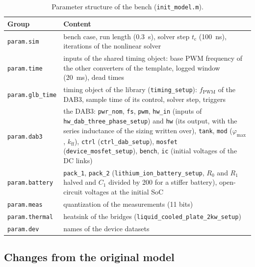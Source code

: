 \documentclass[12pt,a4paper]{scrartcl}
\newcommand{\ped}[1]{_{\mathrm{#1}}}
\newcommand{\code}[1]{\texttt{#1}}
\begin{document}
\begin{onehalfspace}
\begin{table}[H]
	\centering
	\captionsetup{width=0.9\textwidth, font=small}
	\caption[Parameter structure of the bench.]{Parameter structure of the bench (\code{init\_model.m}).}
	\label{tab:param}
	\small
	\begin{tabularx}{0.97\textwidth}{@{} >{\raggedright\arraybackslash}p{} X @{}}
		\toprule
		\textbf{Group} & \textbf{Content} \\
		\midrule
		\code{param.sim} & bench case, run length (\SI{0.3}{\second}), solver step $t\ped{c}$ (\SI{100}{\nano\second}), iterations of the nonlinear solver \\
		\code{param.time} & inputs of the shared timing object: base PWM frequency of the other converters of the template, logged window (\SI{20}{\milli\second}), dead times \\
		\code{param.glb\_time} & timing object of the library (\code{timing\_setup}): $f\ped{PWM}$ of the DAB3, sample time of its control, solver step, triggers \\
		\code{param.dab3} & the DAB3: \code{pwr\_nom}, \code{fs}, \code{pwm}, \code{hw\_in} (inputs of \code{hw\_dab\_three\_phase\_setup}) and \code{hw} (its output, with the series inductance of the sizing written over), \code{tank}, \code{mod} ($\varphi\ped{max}$, $k\ped{ff}$), \code{ctrl} (\code{ctrl\_dab\_setup}), \code{mosfet} (\code{device\_mosfet\_setup}), \code{bench}, \code{ic} (initial voltages of the DC links) \\
		\code{param.battery} & \code{pack\_1}, \code{pack\_2} (\code{lithium\_ion\_battery\_setup}, $R\ped{0}$ and $R\ped{1}$ halved and $C\ped{1}$ divided by 200 for a stiffer battery), open-circuit voltages at the initial SoC \\
		\code{param.meas} & quantization of the measurements (11 bits) \\
		\code{param.thermal} & heatsink of the bridges (\code{liquid\_cooled\_plate\_2kw\_setup}) \\
		\code{param.dev} & names of the device datasets \\
		\bottomrule
	\end{tabularx}
\end{table}

\subsection{Changes from the original model}
\label{sec:changes}


\end{onehalfspace}
\end{document}
